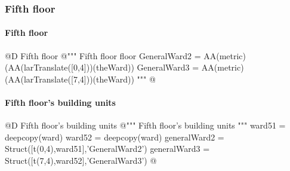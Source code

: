 \documentclass[11pt,oneside]{article}    %
\begin{document}
\subsubsection{Fifth floor}
\paragraph{Fifth floor}
@D Fifth floor
@{""" Fifth floor floor 
GeneralWard2 = AA(metric)(AA(larTranslate([0,4]))(theWard))
GeneralWard3 = AA(metric)(AA(larTranslate([7,4]))(theWard)) """
@}


\paragraph{Fifth floor's building units}
@D Fifth floor's building units 
@{""" Fifth floor's building units """
ward51 = deepcopy(ward)
ward52 = deepcopy(ward)
generalWard2 = Struct([t(0,4),ward51],'GeneralWard2')
generalWard3 = Struct([t(7,4),ward52],'GeneralWard3')
@}
\end{document}
